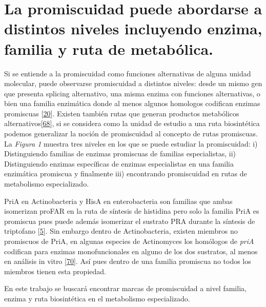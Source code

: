 \documentclass[12pt,twoside]{reedthesis}
\begin{document}
  \nocite{@nobeli_protein_2009,@lamble_archaea_promiscuou_pathways_2003,@weng_promiscuity_specialized_pathways_2012,@baronagomez_occurrence_2003,@juarez-vazquez_evolution_2017}
  
  \section{La promiscuidad puede abordarse a distintos niveles incluyendo
  enzima, familia y ruta de
  metabólica.}\label{la-promiscuidad-puede-abordarse-a-distintos-niveles-incluyendo-enzima-familia-y-ruta-de-metabolica.}
  
  Si se entiende a la promiscuidad como funciones alternativas de alguna
  unidad molecular, puede observarse promiscuidad a distintos niveles:
  desde un mismo gen que presenta splicing alternativo, una misma enzima
  con funciones alternativas, o bien una familia enzimática donde al menos
  algunos homologos codifican enzimas promiscuas
  {[}\protect\hyperlink{ref-nobeli_protein_2009}{20}{]}. Existen también
  rutas que generan productos metabólicos
  alternativos{[}\protect\hyperlink{ref-lamble_archaea_promiscuou_pathways_2003}{68}{]},
  si se considera como la unidad de estudio a una ruta biosintética
  podemos generalizar la noción de promiscuidad al concepto de rutas
  promiscuas. La \emph{Figura 1} muestra tres niveles en los que se puede
  estudiar la promiscuidad: i) Distinguiendo familias de enzimas
  promiscuas de familias especialistas, ii) Distinguiendo enzimas
  específicas de enzimas especialistas en una familia enzimática promiscua
  y finalmente iii) encontrando promiscuidad en rutas de metabolismo
  especializado.
  
  PriA en Actinobacteria y HisA en enterobacteria son familias que ambas
  isomerizan proFAR en la ruta de síntesis de histidina pero solo la
  familia PriA es promiscua pues puede además isomerizar el sustrato PRA
  durante la síntesis de triptofano
  {[}\protect\hyperlink{ref-baronagomez_occurrence_2003}{5}{]}. Sin
  embargo dentro de Actinobacteria, existen miembros no promiscuos de
  PriA, en algunas especies de Actinomyces los homólogos de \emph{priA}
  codifican para enzimas monofuncionales en alguno de los dos sustratos,
  al menos en análisis in vitro
  {[}\protect\hyperlink{ref-juarez-vazquez_evolution_2017}{70}{]}. Así
  pues dentro de una familia promiscua no todos los miembros tienen esta
  propiedad.
  
  En este trabajo se buscará encontrar marcas de promiscuidad a nivel
  familia, enzima y ruta biosintética en el metabolismo especializado.
  
\end{document}
